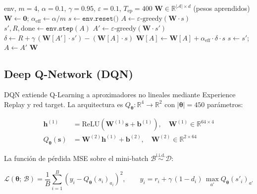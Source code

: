 \begin{algorithm}
\caption{SARSA Semi-Gradiente (on-policy, TD(0))}\label{algo:sarsa}
\begin{algorithmic}[1]
\Require env, $m{=}4$, $\alpha{=}0.1$, $\gamma{=}0.95$, $\varepsilon{=}0.1$, $T_{\text{ep}}{=}400$
\Ensure $\mathbf{W} \in \mathbb{R}^{|\mathcal{A}|\times d}$ (pesos aprendidos)
\State $\mathbf{W} \gets \mathbf{0}$;\; $\alpha_{\text{eff}} \gets \alpha/m$
  \State $s \gets \texttt{env.reset()}$ 
  \State $A \gets \varepsilon\text{-greedy}(\mathbf{W} \cdot s)$
    \State $s', R, \text{done} \gets \texttt{env.step}(A)$
    \State $A' \gets \varepsilon\text{-greedy}(\mathbf{W} \cdot s')$
    \State $\delta \gets R + \gamma\,(\mathbf{W}[A'] \cdot s') - (\mathbf{W}[A] \cdot s)$
    \State $\mathbf{W}[A] \gets \mathbf{W}[A] + \alpha_{\text{eff}}\cdot\delta\cdot s$
    \State $s \gets s'$;\; $A \gets A'$
  \EndWhile
\EndFor
\State \Return $\mathbf{W}$
\end{algorithmic}
\end{algorithm}

\subsection{Deep Q-Network (DQN)}

DQN \cite{Mnih2015} extiende Q-Learning a aproximadores no lineales mediante Experience Replay y red target. La arquitectura es $Q_{\boldsymbol{\theta}}: \mathbb{R}^4 \to \mathbb{R}^2$ con $|\boldsymbol{\theta}| = 450$ parámetros:

\begin{align}
  \mathbf{h}^{(1)} &= \text{ReLU}\!\left(\mathbf{W}^{(1)}\mathbf{s} + \mathbf{b}^{(1)}\right), \quad \mathbf{W}^{(1)} \in \mathbb{R}^{64\times4} \\
  Q_{\boldsymbol{\theta}}(\mathbf{s}) &= \mathbf{W}^{(2)}\mathbf{h}^{(1)} + \mathbf{b}^{(2)}, \quad \mathbf{W}^{(2)} \in \mathbb{R}^{2\times64}
\end{align}

La función de pérdida MSE sobre el mini-batch $\mathcal{B} \overset{\text{i.i.d.}}{\sim} \mathcal{D}$:

\begin{equation}
  \mathcal{L}(\boldsymbol{\theta};\,\mathcal{B}) = \frac{1}{B}\sum_{i=1}^{B}\left(y_i - Q_{\boldsymbol{\theta}}(s_i)_{a_i}\right)^2, \qquad y_i = r_i + \gamma\,(1-d_i)\,\max_{a'} Q_{\boldsymbol{\theta}}(s'_i)_{a'}
\end{equation}

